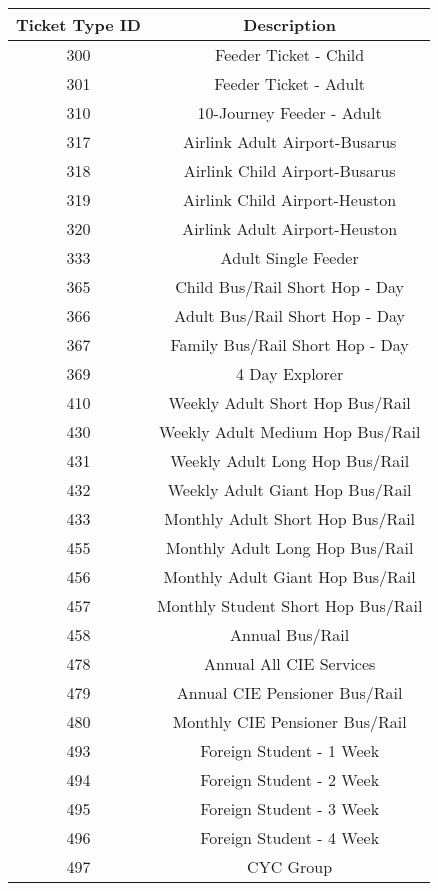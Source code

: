 \begin{longtable}[htbp]
{cc} \hline \textbf{Ticket Type ID} & \textbf{Description} \\\hline \hline \hline
\endhead

 300&
Feeder Ticket - Child \\
\hline 301&
Feeder Ticket - Adult \\
\hline 310&
10-Journey Feeder - Adult \\
\hline 317&
Airlink Adult Airport-Busarus \\
\hline 318&
Airlink Child Airport-Busarus \\
\hline 319&
Airlink Child Airport-Heuston \\
\hline 320&
Airlink Adult Airport-Heuston \\
\hline 333&
Adult Single Feeder \\
\hline 365&
Child Bus/Rail Short Hop - Day \\
\hline 366&
Adult Bus/Rail Short Hop - Day \\
\hline 367&
Family Bus/Rail Short Hop - Day \\
\hline 369&
4 Day Explorer \\
\hline 410&
Weekly Adult Short Hop Bus/Rail \\
\hline 430&
Weekly Adult Medium Hop Bus/Rail \\
\hline 431&
Weekly Adult Long Hop Bus/Rail \\
\hline 432&
Weekly Adult Giant Hop Bus/Rail \\
\hline 433&
Monthly Adult Short Hop Bus/Rail \\
\hline 455&
Monthly Adult Long Hop Bus/Rail \\
\hline 456&
Monthly Adult Giant Hop Bus/Rail \\
\hline 457&
Monthly Student Short Hop Bus/Rail \\
\hline 458&
Annual Bus/Rail \\
\hline 478&
Annual All CIE Services \\
\hline 479&
Annual CIE Pensioner Bus/Rail \\
\hline 480&
Monthly CIE Pensioner Bus/Rail \\
\hline 493&
Foreign Student - 1 Week \\
\hline 494&
Foreign Student - 2 Week \\
\hline 495&
Foreign Student - 3 Week \\
\hline 496&
Foreign Student - 4 Week \\
\hline 497&
CYC Group \\

\end{longtable}
